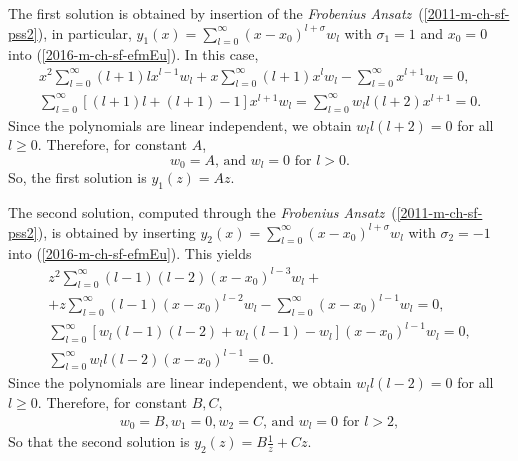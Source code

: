 {\begin{enumerate}
The first solution is obtained by insertion of the {\it Frobenius Ansatz}~(\ref{2011-m-ch-sf-pss2}),
in particular,
$y_1(x) =  \sum_{l=0}^\infty (x-x_0)^{l + \sigma} w_l$ with $\sigma_{1} =  1$ and  $x_0=0$
into (\ref{2016-m-ch-sf-efmEu}).
In this case,
\begin{equation}
\begin{split}
x^2 \sum_{l=0}^\infty (l+1)l x^{l - 1} w_l
+
x \sum_{l=0}^\infty (l+1) x^{l} w_l
-
\sum_{l=0}^\infty   x^{l+1} w_l = 0,
\\
\sum_{l=0}^\infty \left[ (l+1)l +  (l+1) - 1 \right] x^{l+1} w_l =
\sum_{l=0}^\infty w_l l (l+2)   x^{l+1} = 0.
\end{split}
\end{equation}
Since
the polynomials are linear independent, we obtain  $ w_l l (l+2) = 0  $ for all $l \ge 0$.
Therefore, for constant $A$,
\begin{equation}
 w_0  = A \textrm{, and }
 w_l  = 0 \textrm{ for } l > 0.
\end{equation}
So, the first solution is $y_1(z) = Az$.

The second solution, computed through the {\it Frobenius Ansatz}~(\ref{2011-m-ch-sf-pss2}),
is obtained by inserting
$y_2(x) =  \sum_{l=0}^\infty (x-x_0)^{l + \sigma} w_l$ with $\sigma_{2} =  -1$
into (\ref{2016-m-ch-sf-efmEu}).
This yields
\begin{equation}
\begin{split}
z^2 \sum_{l=0}^\infty (l-1)(l-2) (x-x_0)^{l - 3} w_l  +\\
+
z \sum_{l=0}^\infty (l-1) (x-x_0)^{l-2} w_l
-
\sum_{l=0}^\infty   (x-x_0)^{l-1} w_l = 0,
\\
\sum_{l=0}^\infty \left[ w_l (l-1)(l-2) + w_l (l-1) - w_l \right] (x-x_0)^{l-1} w_l = 0,
\\
\sum_{l=0}^\infty w_l l (l-2)   (x-x_0)^{l-1}  = 0.
\end{split}
\end{equation}
Since the polynomials are linear independent, we obtain  $ w_l l (l-2) = 0  $ for all $l \ge 0$.
Therefore, for constant $B,C$,
\begin{equation}
\begin{split}
 w_0  = B ,
 w_1  = 0,
 w_2  = C \textrm{, and }
 w_l  = 0 \textrm{ for } l > 2,
\end{split}
\end{equation}
So that the second solution is $y_2(z) = B\frac{1}{z}+ Cz$.


\end{enumerate}}
